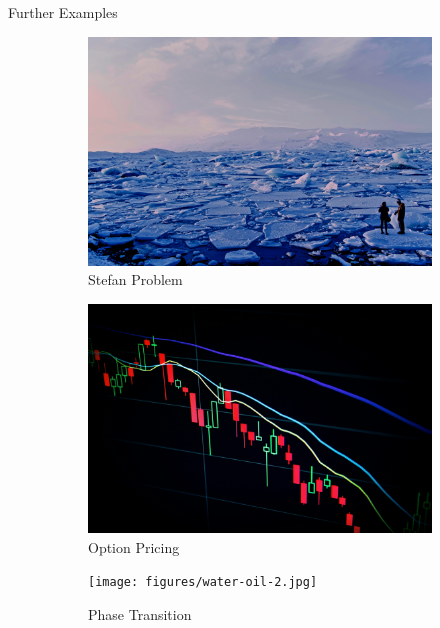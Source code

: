 \documentclass[aspectratio=169,xcolor=dvipsnames,11pt]{beamer}
\begin{document}
\begin{frame}{Further Examples}
\begin{figure}
  \centering
  \begin{subfigure}[b]{0.19\textwidth}
    \includegraphics[width=\linewidth]{figures/ice.jpg}
    \caption{Stefan Problem}
  \end{subfigure}
  \hfill
  \begin{subfigure}[b]{0.19\textwidth}
    \includegraphics[width=\linewidth]{figures/stocks.jpg}
    \caption{Option Pricing}
  \end{subfigure}
  \hfill
  \begin{subfigure}[b]{0.19\textwidth}
    \texttt{[image: figures/water-oil-2.jpg]}
    \caption{Phase Transition}
  \end{subfigure}\\
  \begin{subfigure}[b]{0.19\textwidth}

\end{subfigure}
\end{figure}
\end{frame}
\end{document}
